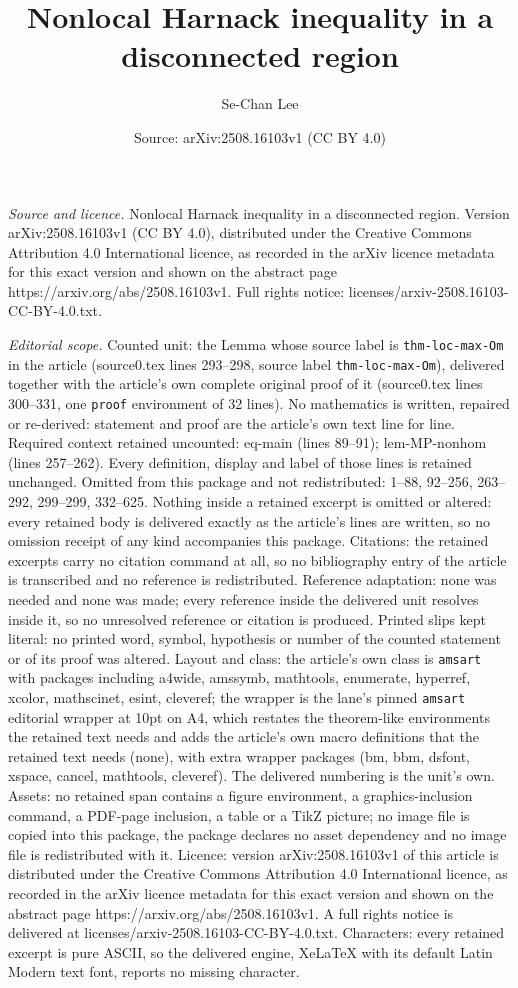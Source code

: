 \documentclass[10pt,a4paper]{amsart}
\title[Nonlocal Harnack inequality in a disconnected region]{Nonlocal Harnack inequality in a disconnected region}
\author{Se-Chan Lee}
\date{Source: arXiv:2508.16103v1 (CC BY 4.0)}
\begin{document}
\maketitle

\noindent\emph{Source and licence.} Nonlocal Harnack inequality in a disconnected region. Version arXiv:2508.16103v1 (CC BY 4.0), distributed under the Creative Commons Attribution 4.0 International licence, as recorded in the arXiv licence metadata for this exact version and shown on the abstract page https://arxiv.org/abs/2508.16103v1. Full rights notice: licenses/arxiv-2508.16103-CC-BY-4.0.txt.\par\smallskip

\noindent\textit{Editorial scope.} Counted unit: the Lemma whose source label is \texttt{thm-loc-max-Om} in the article (source0.tex lines 293--298, source label \texttt{thm-loc-max-Om}), delivered together with the article's own complete original proof of it (source0.tex lines 300--331, one \texttt{proof} environment of 32 lines). No mathematics is written, repaired or re-derived: statement and proof are the article's own text line for line. Required context retained uncounted: eq-main (lines 89--91); lem-MP-nonhom (lines 257--262). Every definition, display and label of those lines is retained unchanged. Omitted from this package and not redistributed: 1--88, 92--256, 263--292, 299--299, 332--625. Nothing inside a retained excerpt is omitted or altered: every retained body is delivered exactly as the article's lines are written, so no omission receipt of any kind accompanies this package. Citations: the retained excerpts carry no citation command at all, so no bibliography entry of the article is transcribed and no reference is redistributed. Reference adaptation: none was needed and none was made; every reference inside the delivered unit resolves inside it, so no unresolved reference or citation is produced. Printed slips kept literal: no printed word, symbol, hypothesis or number of the counted statement or of its proof was altered. Layout and class: the article's own class is \texttt{amsart} with packages including a4wide, amssymb, mathtools, enumerate, hyperref, xcolor, mathscinet, esint, cleveref; the wrapper is the lane's pinned \texttt{amsart} editorial wrapper at 10pt on A4, which restates the theorem-like environments the retained text needs and adds the article's own macro definitions that the retained text needs (none), with extra wrapper packages (bm, bbm, dsfont, xspace, cancel, mathtools, cleveref). The delivered numbering is the unit's own. Assets: no retained span contains a figure environment, a graphics-inclusion command, a PDF-page inclusion, a table or a TikZ picture; no image file is copied into this package, the package declares no asset dependency and no image file is redistributed with it. Licence: version arXiv:2508.16103v1 of this article is distributed under the Creative Commons Attribution 4.0 International licence, as recorded in the arXiv licence metadata for this exact version and shown on the abstract page https://arxiv.org/abs/2508.16103v1. A full rights notice is delivered at licenses/arxiv-2508.16103-CC-BY-4.0.txt. Characters: every retained excerpt is pure ASCII, so the delivered engine, XeLaTeX with its default Latin Modern text font, reports no missing character.
\end{document}

